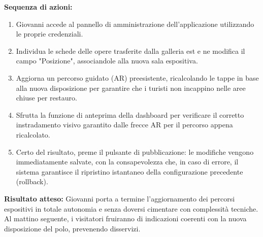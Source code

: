 \vspace{0.3cm}
\noindent\textbf{\color{culturiaRed}Sequenza di azioni:}
\begin{enumerate}[nosep, leftmargin=1.4em]
  \item Giovanni accede al pannello di amministrazione dell'applicazione utilizzando le proprie credenziali.
  \item Individua le schede delle opere trasferite dalla galleria est e ne modifica il campo "Posizione", associandole alla nuova sala espositiva.
  \item Aggiorna un percorso guidato (AR) preesistente, ricalcolando le tappe in base alla nuova disposizione per garantire che i turisti non incappino nelle aree chiuse per restauro.
  \item Sfrutta la funzione di anteprima della dashboard per verificare il corretto instradamento visivo garantito dalle frecce AR per il percorso appena ricalcolato.
  \item Certo del risultato, preme il pulsante di pubblicazione: le modifiche vengono immediatamente salvate, con la consapevolezza che, in caso di errore, il sistema garantisce il ripristino istantaneo della configurazione precedente (rollback).
\end{enumerate}

\vspace{0.15cm}
\noindent\textbf{\color{culturiaRed}Risultato atteso:}
Giovanni porta a termine l'aggiornamento dei percorsi espositivi in totale autonomia e senza doversi cimentare con complessità tecniche. Al mattino seguente, i visitatori fruiranno di indicazioni coerenti con la nuova disposizione del polo, prevenendo disservizi.
